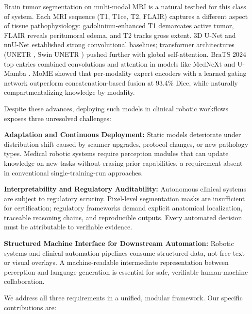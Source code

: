 \documentclass[conference]{IEEEtran}
\begin{document}
Brain tumor segmentation on multi-modal MRI is a natural testbed for this class of system. Each MRI sequence (T1, T1ce, T2, FLAIR) captures a different aspect of tissue pathophysiology: gadolinium-enhanced T1 demarcates active tumor, FLAIR reveals peritumoral edema, and T2 tracks gross extent. 3D U-Net \cite{ronneberger2015unet} and nnU-Net \cite{isensee2021nnu} established strong convolutional baselines; transformer architectures (UNETR \cite{hatamizadeh2022unetr}, Swin UNETR \cite{hatamizadeh2022swin}) pushed further with global self-attention. BraTS 2024 \cite{brats2024} top entries combined convolutions and attention in models like MedNeXt \cite{roy2024mednext} and U-Mamba \cite{ma2024umamba}. MoME \cite{zhang2024mome} showed that per-modality expert encoders with a learned gating network outperform concatenation-based fusion at 93.4\% Dice, while naturally compartmentalizing knowledge by modality.

Despite these advances, deploying such models in clinical robotic workflows exposes three unresolved challenges:

\textbf{Adaptation and Continuous Deployment:} Static models deteriorate under distribution shift caused by scanner upgrades, protocol changes, or new pathology types. Medical robotic systems require perception modules that can update knowledge on new tasks without erasing prior capabilities, a requirement absent in conventional single-training-run approaches.

\textbf{Interpretability and Regulatory Auditability:} Autonomous clinical systems are subject to regulatory scrutiny. Pixel-level segmentation masks are insufficient for certification; regulatory frameworks demand explicit anatomical localization, traceable reasoning chains, and reproducible outputs. Every automated decision must be attributable to verifiable evidence.

\textbf{Structured Machine Interface for Downstream Automation:} Robotic systems and clinical automation pipelines consume structured data, not free-text or visual overlays. A machine-readable intermediate representation between perception and language generation is essential for safe, verifiable human-machine collaboration.

We address all three requirements in a unified, modular framework. Our specific contributions are:
\end{document}
